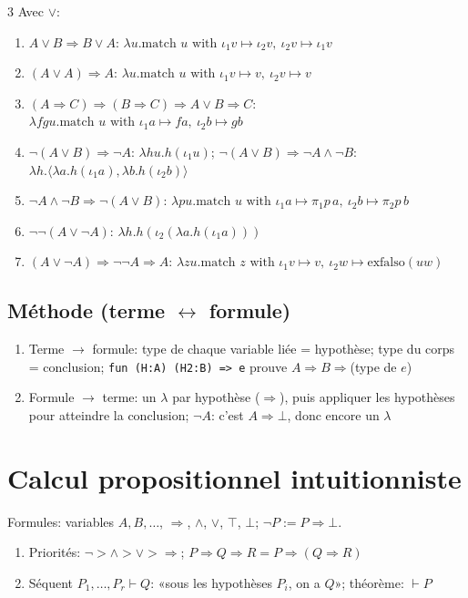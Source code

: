 \documentclass[12pt, a4paper]{article}
\newcommand{\inj}[1]{\iota_{#1}}
\newcommand{\vd}{\vdash}
\begin{document}
\begin{multicols*}{3}
	Avec $\vee$:
	\begin{enumerate}[\roman*.]
		\item $A\vee B\Rightarrow B\vee A$: $\lambda u.\text{match }u\text{ with }\inj1v\mapsto\inj2v,\ \inj2v\mapsto\inj1v$
		\item $(A\vee A)\Rightarrow A$: $\lambda u.\text{match }u\text{ with }\inj1v\mapsto v,\ \inj2v\mapsto v$
		\item $(A\Rightarrow C)\Rightarrow(B\Rightarrow C)\Rightarrow A\vee B\Rightarrow C$: $\lambda fgu.\text{match }u\text{ with }\inj1a\mapsto fa,\ \inj2b\mapsto gb$
		\item $\neg(A\vee B)\Rightarrow\neg A$: $\lambda hu.h(\inj1u)$; $\neg(A\vee B)\Rightarrow\neg A\wedge\neg B$: $\lambda h.\langle\lambda a.h(\inj1a),\lambda b.h(\inj2b)\rangle$
		\item $\neg A\wedge\neg B\Rightarrow\neg(A\vee B)$: $\lambda pu.\text{match }u\text{ with }\inj1a\mapsto\pi_1p\,a,\ \inj2b\mapsto\pi_2p\,b$
		\item $\neg\neg(A\vee\neg A)$: $\lambda h.h(\inj2(\lambda a.h(\inj1a)))$
		\item $(A\vee\neg A)\Rightarrow\neg\neg A\Rightarrow A$: $\lambda zu.\text{match }z\text{ with }\inj1v\mapsto v,\ \inj2w\mapsto\text{exfalso}(uw)$
	\end{enumerate}

	\subsection{Méthode (terme $\leftrightarrow$ formule)}
	\begin{enumerate}[\roman*.]
		\item Terme $\to$ formule: type de chaque variable liée = hypothèse; type du corps = conclusion; \texttt{fun (H:A) (H2:B) => e} prouve $A\Rightarrow B\Rightarrow$(type de $e$)
		\item Formule $\to$ terme: un $\lambda$ par hypothèse ($\Rightarrow$), puis appliquer les hypothèses pour atteindre la conclusion; $\neg A$: c'est $A\Rightarrow\bot$, donc encore un $\lambda$
	\end{enumerate}

	\colbreak
	\section{Calcul propositionnel intuitionniste}
	Formules: variables $A,B,\dots$, $\Rightarrow$, $\wedge$, $\vee$, $\top$, $\bot$; $\neg P:=P\Rightarrow\bot$.
	\begin{enumerate}[\roman*.]
		\item Priorités: $\neg>\wedge>\vee>\Rightarrow$; $P\Rightarrow Q\Rightarrow R=P\Rightarrow(Q\Rightarrow R)$
		\item Séquent $P_1,\dots,P_r\vd Q$: «sous les hypothèses $P_i$, on a $Q$»; théorème: $\vd P$
	\end{enumerate}


\end{multicols*}
\end{document}
